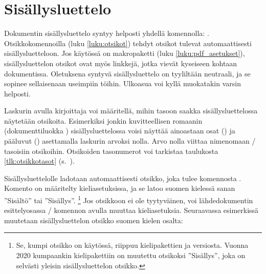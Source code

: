 \section{Sisällysluettelo}
\label{luku:sisallysluettelo}

Dokumentin sisällysluettelo syntyy helposti yhdellä komennolla:
. Otsikkokomennoilla (luku \ref{luku:otsikot})
tehdyt otsikot tulevat automaattisesti sisällysluetteloon. Jos käytössä
on makropaketti  (luku \ref{luku:pdf_asetukset}),
sisällysluettelon otsikot ovat myös linkkejä, jotka vievät kyseiseen
kohtaan dokumentissa. Oletuksena syntyvä sisällysluettelo on tyyliltään
neutraali, ja se sopinee sellaisenaan useimpiin töihin. Ulkoasua voi
kyllä muokatakin varsin helposti.

\begin{koodilohkosis}
  \tableofcontents
\end{koodilohkosis}

Laskurin  avulla kirjoittaja voi määritellä, mihin
tasoon saakka sisällysluettelossa näytetään otsikoita. Esimerkiksi
jonkin kuvitteellisen romaanin (dokumenttiluokka )
sisällysluettelossa voisi näyttää ainoastaan osat () ja
pääluvut () asettamalla laskurin arvoksi nolla. Arvo
nolla viittaa nimenomaan \-/ tasoisiin otsikoihin.
Otsikoiden tasonumerot voi tarkistaa taulukosta \ref{tlk:otsikkotasot}
(s.~\pageref{tlk:otsikkotasot}).

\begin{koodilohkosis}
  \setcounter{tocdepth}{0}
\end{koodilohkosis}

Sisällysluettelolle ladotaan automaattisesti otsikko, joka tulee
komennosta . Komento on määritelty
kieliasetuksissa, ja se latoo suomen kielessä sanan ''Sisältö'' tai
''Sisällys''.%
\footnote{Se, kumpi otsikko on käytössä, riippuu kielipakettien
   ja  versiosta. Vuonna 2020
  kumpaankin kielipakettiin on muutettu otsikoksi ''Sisällys'', joka on
  selvästi yleisin sisällysluettelon otsikko.} Jos otsikkoon ei ole
tyytyväinen, voi lähdedokumentin esittelyosassa \-/
komennon avulla muuttaa kieliasetuksia. Seuraavassa esimerkissä
muutetaan sisällysluettelon otsikko suomen kielen osalta:

\begin{koodilohkosis}
  \addto{\captionsfinnish}{
    \renewcommand{\contentsname}{Sisällysluettelo}
  }
\end{koodilohkosis}

